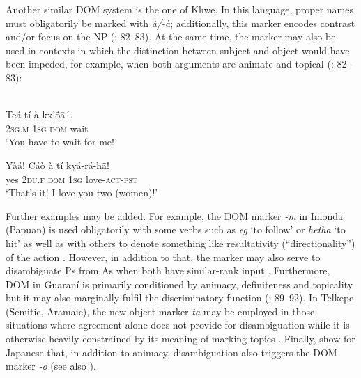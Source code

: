 \documentclass[output=paper]{langsci/langscibook}
\begin{document}
Another similar DOM system is the one of Khwe. In this language, proper names must obligatorily be marked with \textit{à/-à}; additionally, this marker encodes contrast and/or focus on the NP (\citealt{KilianHatz2006}: 82–83). At the same time, the marker may also be used in contexts in which the distinction between subject and object would have been impeded, for example, when both arguments are animate and topical (\citealt{KilianHatz2006}: 82–83):

\ea 
{}\\
\ea
\gll  Tcá   tí   à   kx’ṓā´.\\
     \textsc{2sg.m}   \textsc{1sg}   \textsc{dom}  wait\\
\glt ‘You have to wait for me!’

\ex
\gll Yàá!   Cáò   à   tí   kyá-rá-hã!\\
     yes   \textsc{2du.f}   \textsc{dom}  \textsc{1sg}  love-\textsc{act-pst}\\
\glt ‘That’s it! I love you two (women)!’
\z
\z

Further examples may be added. For example, the DOM marker \textit{{}-m} in Imonda (Papuan) is used obligatorily with some verbs such as \textit{eg} ‘to follow’ or \textit{hetha} ‘to hit’ as well as with others to denote something like resultativity (“directionality”) of the action \citep[163]{Seiler1985}. However, in addition to that, the marker may also serve to disambiguate Ps from As when both have similar-rank input \citep[165]{Seiler1985}. Furthermore, DOM in Guaraní is primarily conditioned by animacy, definiteness and topicality but it may also marginally fulfil the discriminatory function (\citealt{Shain2009}: 89–92). In Telkepe (Semitic, Aramaic), the new object marker \textit{ta} may be employed in those situations where agreement alone does not provide for disambiguation while it is otherwise heavily constrained by its meaning of marking topics \citep[354]{Coghill2014}. Finally, \citet{KurumadaJaeger2015} show for Japanese that, in addition to animacy, disambiguation also triggers the DOM marker \textit{{}-o} (see also \citealt{FedzechkinaEtAl2012}).
\end{document}
